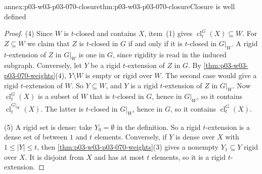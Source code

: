 \begin{annexitem}{annex:p03-w03-p03-070-closure}{thm:p03-w03-p03-070-closure}{Closure is well defined}
\begin{proof}
(4) Since \(W\) is \(t\)-closed and contains \(X\), item~(1) gives
\(\operatorname{cl}^G_t(X)\subseteq W\).  For \(Z\subseteq W\) we claim that
\(Z\) is \(t\)-closed in \(G\) if and only if it is \(t\)-closed in
\(G|_W\).  A rigid \(t\)-extension of \(Z\) in \(G|_W\) is one in \(G\),
since rigidity is read in the induced subgraph.  Conversely, let \(Y\) be a
rigid \(t\)-extension of \(Z\) in \(G\).  By
\cref{thm:p03-w03-p03-070-weights}(4), \(Y\setminus W\) is empty or rigid over
\(W\).  The second case would give a rigid \(t\)-extension of \(W\).  So
\(Y\subseteq W\), and \(Y\) is a rigid \(t\)-extension of \(Z\) in \(G|_W\).
Now \(\operatorname{cl}^G_t(X)\) is a subset of \(W\) that is \(t\)-closed in
\(G\), hence in \(G|_W\), so it contains
\(\operatorname{cl}^{G|_W}_t(X)\).  The latter is \(t\)-closed in \(G|_W\),
hence in \(G\), so it contains \(\operatorname{cl}^G_t(X)\).

(5) A rigid set is dense: take \(Y_0=\emptyset\) in the definition.  So a
rigid \(t\)-extension is a dense set of between \(1\) and \(t\) elements.
Conversely, if \(Y\) is dense over \(X\) with \(1\leq|Y|\leq t\), then
\cref{thm:p03-w03-p03-070-weights}(3) gives a nonempty \(Y_1\subseteq Y\)
rigid over \(X\).  It is disjoint from \(X\) and has at most \(t\) elements,
so it is a rigid \(t\)-extension.
\end{proof}
\end{annexitem}

